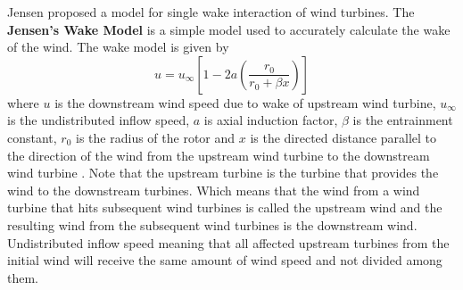     Jensen \cite{book2} proposed a model for single wake interaction of wind turbines. The \textbf{Jensen's Wake Model} is a simple model used to accurately calculate the wake of the wind. The wake model is given by
        \begin{equation}
            u = u_{\infty}\left[1 - 2a\left(\frac{r_{0}}{r_{0}+\beta x}\right)\right]
            \label{jensen}
        \end{equation}
    where $u$ is the downstream wind speed due to wake of upstream wind turbine, $u_{\infty}$ is the undistributed inflow speed, $a$ is axial induction factor, $\beta$ is the entrainment constant, $r_{0}$ is the radius of the rotor and $x$ is the directed distance parallel to the direction of the wind from the upstream wind turbine to the downstream wind turbine \cite{thrust}. Note that the upstream turbine is the turbine that provides the wind to the downstream turbines. Which means that the wind from a wind turbine that hits subsequent wind turbines is called the upstream wind and the resulting wind from the subsequent wind turbines is the downstream wind. Undistributed inflow speed meaning that all affected upstream turbines from the initial wind will receive the same amount of wind speed and not divided among them.
    
